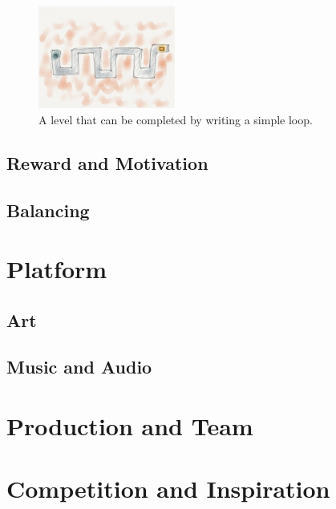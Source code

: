 \documentclass[12pt,journal,compsoc]{IEEEtran}
\begin{document}
\begin{figure}[htb]
    \begin{centering}
    \includegraphics[width=0.4\textwidth]{./figures/codelab4.jpg}
    \caption{A level that can be completed by writing a simple loop.} 
    \label{fig:loop}
    \end{centering} 
\end{figure}


\subsection{Reward and Motivation} 
\subsection{Balancing} 

\section{Platform} 
\subsection{Art} 
\subsection{Music and Audio}

\section{Production and Team} 
\section{Competition and Inspiration}


{}

\end{document}
